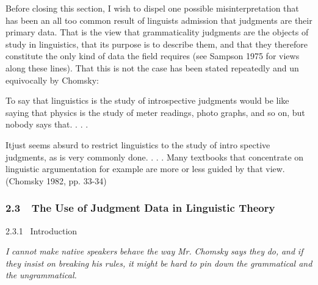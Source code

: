 \begin{styleTextbody}
Before closing this section, I wish to dispel one possible misinterpretation that has been an all too common result of linguists{\textquotesingle} admission that judgments are their primary data. That is the view that grammaticality judgments are the objects of study in linguistics, that its purpose is to describe them, and that they therefore constitute the only kind of data the field requires (see Sampson 1975 for views along these lines). That this is not the case has been stated repeatedly and un\- equivocally by Chomsky:
\end{styleTextbody}


\begin{styleTextbody}
To say that linguistics is the study of introspective judgments would be like saying that physics is the study of meter readings, photo\- graphs, and so on, but nobody says that. . . .
\end{styleTextbody}


\begin{styleTextbody}
Itjust seems absurd to restrict linguistics to the study of intro\- spective judgments, as is very commonly done. . . . Many textbooks that concentrate on linguistic argumentation for example are more or less guided by that view. (Chomsky 1982, pp. 33-34)
\end{styleTextbody}


\subsubsection[2.3\ \ The Use of Judgment Data in Linguistic Theory]{2.3\ \ The Use of Judgment Data in Linguistic Theory}
\begin{styleHeadingviii}
2.3.1 \ Introduction
\end{styleHeadingviii}


\begin{styleStandard}
\textit{I}\textit{ }\textit{cannot}\textit{ }\textit{make}\textit{ }\textit{native}\textit{ }\textit{speakers}\textit{ }\textit{behave}\textit{ }\textit{the}\textit{ }\textit{way}\textit{ }\textit{Mr.}\textit{ }\textit{Chomsky}\textit{ }\textit{says}\textit{ }\textit{they}\textit{ }\textit{do,}\textit{ }\textit{and}\textit{ }\textit{if}\textit{ }\textit{they}\textit{ }\textit{insist}\textit{ }\textit{on}\textit{ }\textit{breaking}\textit{ }\textit{his}\textit{ }\textit{rules,}\textit{ }\textit{it}\textit{ }\textit{might}\textit{ }\textit{be}\textit{ }\textit{hard}\textit{ }\textit{to}\textit{ }\textit{pin}\textit{ }\textit{down}\textit{ }\textit{the}\textit{ }\textit{grammatical and}\textit{ }\textit{the}\textit{ }\textit{ungrammatical.}
\end{styleStandard}


